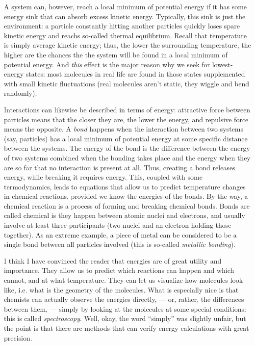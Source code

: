 \documentclass{article}
\begin{document}
A system can, however, reach a local minimum of potential energy if it has some energy sink that can absorb excess kinetic energy. Typically, this sink is just the environment: a particle constantly hitting another particles quickly loses spare kinetic energy and reachs so-called thermal equilibrium. Recall that temperature is simply average kinetic energy; thus, the lower the surrounding temperature, the higher are the chances the the system will be found in a local minimum of potential energy. And \textit{this} effect is the major reason why we seek for lowest-energy states: most molecules in real life are found in those states supplemented with small kinetic fluctuations (real molecules aren't static, they wiggle and bend randomly).

Interactions can likewise be described in terms of energy: attractive force between particles means that the closer they are, the lower the energy, and repulsive force means the opposite. A \textit{bond} happens when the interaction between two systems (say, particles) has a local minimum of potential energy at some specific distance between the systems. The energy of the bond is the difference between the energy of two systems combined when the bonding takes place and the energy when they are so far that no interaction is present at all. Thus, creating a bond releases energy, while breaking it requires energy. This, coupled with some termodynamics, leads to equations that allow us to predict temperature changes in chemical reactions, provided we know the energies of the bonds. By the way, a chemical reaction is a process of forming and breaking chemical bonds. Bonds are called chemical is they happen between atomic nuclei and electrons, and usually involve at least three participants (two nuclei and an electron holding those together). As an extreme example, a piece of metal can be considered to be a single bond between all particles involved (this is so-called \textit{metallic bonding}).

I think I have convinced the reader that energies are of great utility and importance. They allow us to predict which reactions can happen and which cannot, and at what temperature. They can let us visualize how molecules look like, i.e. what is the geometry of the molecules. What is especially nice is that chemists can actually observe the energies directly, --- or, rather, the differences between them, --- simply by looking at the molecules at some special conditions: this is called \textit{spectroscopy}. Well, okay, the word ``simply'' was slightly unfair, but the point is that there are methods that can verify energy calculations with great precision.
\end{document}
